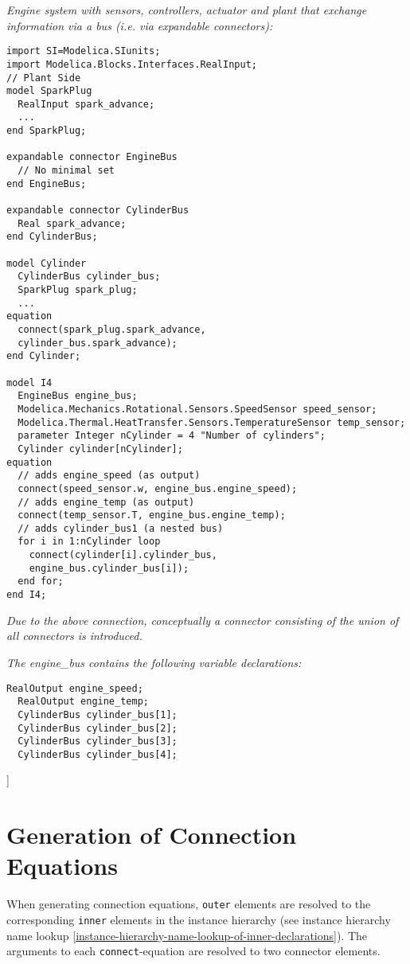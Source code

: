 \emph{Engine system with sensors, controllers, actuator and plant that
exchange information via a bus (i.e. via expandable connectors):}
\begin{lstlisting}[language=modelica]
import SI=Modelica.SIunits;
import Modelica.Blocks.Interfaces.RealInput;
// Plant Side
model SparkPlug
  RealInput spark_advance;
  ...
end SparkPlug;

expandable connector EngineBus
  // No minimal set
end EngineBus;

expandable connector CylinderBus
  Real spark_advance;
end CylinderBus;

model Cylinder
  CylinderBus cylinder_bus;
  SparkPlug spark_plug;
  ...
equation
  connect(spark_plug.spark_advance,
  cylinder_bus.spark_advance);
end Cylinder;

model I4
  EngineBus engine_bus;
  Modelica.Mechanics.Rotational.Sensors.SpeedSensor speed_sensor;
  Modelica.Thermal.HeatTransfer.Sensors.TemperatureSensor temp_sensor;
  parameter Integer nCylinder = 4 "Number of cylinders";
  Cylinder cylinder[nCylinder];
equation
  // adds engine_speed (as output)
  connect(speed_sensor.w, engine_bus.engine_speed);
  // adds engine_temp (as output)
  connect(temp_sensor.T, engine_bus.engine_temp);
  // adds cylinder_bus1 (a nested bus)
  for i in 1:nCylinder loop
    connect(cylinder[i].cylinder_bus,
    engine_bus.cylinder_bus[i]);
  end for;
end I4;
\end{lstlisting}
\emph{Due to the above connection, conceptually a connector consisting
of the union of all connectors is introduced.}

\emph{The engine\_bus contains the following variable declarations:}
\begin{lstlisting}[language=modelica]
  RealOutput engine_speed;
  RealOutput engine_temp;
  CylinderBus cylinder_bus[1];
  CylinderBus cylinder_bus[2];
  CylinderBus cylinder_bus[3];
  CylinderBus cylinder_bus[4];
\end{lstlisting}
{]}

\section{Generation of Connection Equations}

When generating connection equations, \lstinline!outer! elements are resolved to the
corresponding \lstinline!inner! elements in the instance hierarchy (see instance
hierarchy name lookup \autoref{instance-hierarchy-name-lookup-of-inner-declarations}). The arguments to each \lstinline!connect!-equation are
resolved to two connector elements.

